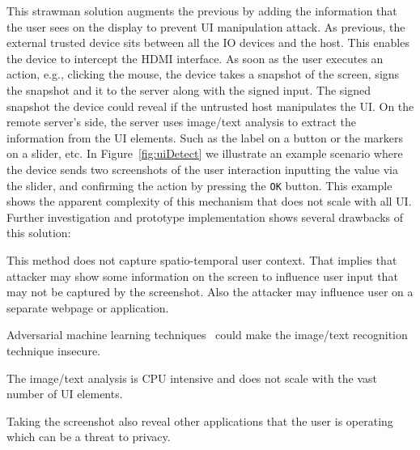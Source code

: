 This strawman solution augments the previous by adding the information that the user sees on the display to prevent UI manipulation attack. As previous, the external trusted device sits between all the IO devices and the host. This enables the device to intercept the HDMI interface. As soon as the user executes an action, e.g., clicking the mouse, the device takes a snapshot of the screen, signs the snapshot and it to the server along with the signed input. The signed snapshot the device could reveal if the untrusted host manipulates the UI. On the remote server's side, the server uses image/text analysis to extract the information from the UI elements. Such as the label on a button or the markers on a slider, etc. In Figure~\ref{fig:uiDetect} we illustrate an example scenario where the device sends two screenshots of the user interaction \one inputting the value via the slider, and \two confirming the action by pressing the \texttt{OK} button.
This example shows the apparent complexity of this mechanism that does not scale with all UI. Further investigation and prototype implementation shows several drawbacks of this solution:


\begin{mylist}
  \item This method does not capture spatio-temporal user context. That implies that attacker may show some information on the screen to influence user input that may not be captured by the screenshot. Also the attacker may influence user on a separate webpage or application.
  \item Adversarial machine learning techniques~\cite{eykholt2017robust,sitawarin2018rogue} could make the image/text recognition technique insecure.
  \item The image/text analysis is CPU intensive and does not scale with the vast number of UI elements.
  \item Taking the screenshot also reveal other applications that the user is operating which can be a threat to privacy.
\end{mylist}



